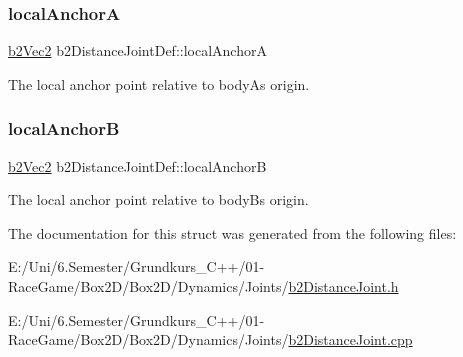 \mbox{\label{structb2_distance_joint_def_a15c7a75fa277e2056bf1b44198658518}} 
\subsubsection{\texorpdfstring{localAnchorA}{localAnchorA}}
{\footnotesize\ttfamily \mbox{\hyperlink{structb2_vec2}{b2\+Vec2}} b2\+Distance\+Joint\+Def\+::local\+AnchorA}



The local anchor point relative to bodyA\textquotesingle{}s origin. 

\mbox{\label{structb2_distance_joint_def_a3c8995be726238eee084af750442255c}} 
\subsubsection{\texorpdfstring{localAnchorB}{localAnchorB}}
{\footnotesize\ttfamily \mbox{\hyperlink{structb2_vec2}{b2\+Vec2}} b2\+Distance\+Joint\+Def\+::local\+AnchorB}



The local anchor point relative to bodyB\textquotesingle{}s origin. 



The documentation for this struct was generated from the following files\+:\begin{DoxyCompactItemize}
\item 
E\+:/\+Uni/6.\+Semester/\+Grundkurs\+\_\+\+C++/01-\/\+Race\+Game/\+Box2\+D/\+Box2\+D/\+Dynamics/\+Joints/\mbox{\hyperlink{b2_distance_joint_8h}{b2\+Distance\+Joint.\+h}}\item 
E\+:/\+Uni/6.\+Semester/\+Grundkurs\+\_\+\+C++/01-\/\+Race\+Game/\+Box2\+D/\+Box2\+D/\+Dynamics/\+Joints/\mbox{\hyperlink{b2_distance_joint_8cpp}{b2\+Distance\+Joint.\+cpp}}\end{DoxyCompactItemize}
